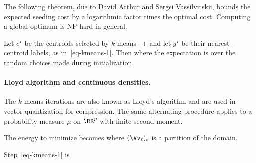The following theorem, due to David Arthur and Sergei Vassilvitskii, bounds the expected seeding cost by a logarithmic factor times the optimal cost. Computing a global optimum is NP-hard in general.

\begin{thm}
	Let $c^\star$ be the centroids selected by $k$-means++ and let $y^\star$ be their nearest-centroid labels, as in~\eqref{eq-kmeans-1}. Then
	where the expectation is over the random choices made during initialization.
\end{thm}




    
\paragraph{Lloyd algorithm and continuous densities.}

The $k$-means iterations are also known as Lloyd's algorithm and are used in vector quantization for compression. The same alternating procedure applies to a probability measure $\mu$ on $\RR^p$ with finite second moment.
 
The energy to minimize becomes
where $(\Vv_\ell)_\ell$ is a partition of the domain. 
 
Step~\eqref{eq-kmeans-1} is 